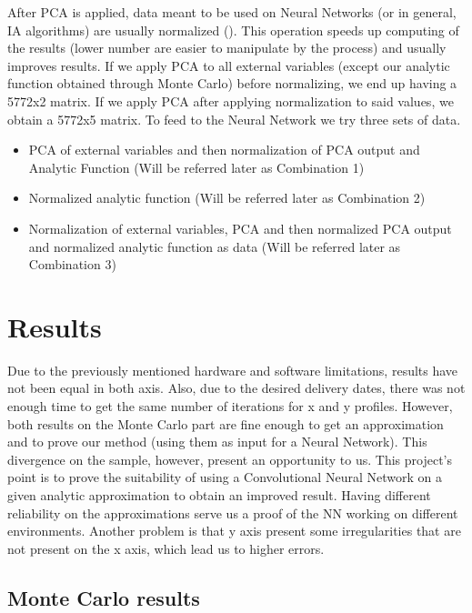\documentclass[openany]{article}
\begin{document}
\newpage 

After PCA is applied, data meant to be used on Neural Networks (or in general, IA algorithms) are usually normalized (\cite{589532}). This operation speeds up computing of the results (lower number are easier to manipulate by the process) and usually improves results. If we apply PCA to all external variables (except our analytic function obtained through Monte Carlo) before normalizing, we end up having a 5772x2 matrix. If we apply PCA after applying normalization to said values, we obtain a 5772x5 matrix. To feed to the Neural Network we try three sets of data.

\begin{itemize}
    \item PCA of external variables and then normalization of PCA output and Analytic Function (Will be referred later as Combination 1)
    \item Normalized analytic function (Will be referred later as Combination 2)
    \item Normalization of external variables, PCA and then normalized PCA output and normalized  analytic function as data (Will be referred later as Combination 3)
\end{itemize}




\newpage 

\section{Results}

Due to the previously mentioned hardware and software limitations, results have not been equal in both axis. Also, due to the desired delivery dates, there was not enough time to get the same number of iterations for x and y profiles. However, both results on the Monte Carlo part are fine enough to get an approximation and to prove our method (using them as input for a Neural Network). This divergence on the sample, however, present an opportunity to us. This project's point is to prove the suitability of using a Convolutional Neural Network on a given analytic approximation to obtain an improved result. Having different reliability on the approximations serve us a proof of the NN working on different environments. Another problem is that y axis present some irregularities that are not present on the x axis, which lead us to higher errors. \\


\subsection{Monte Carlo results}
\end{document}
